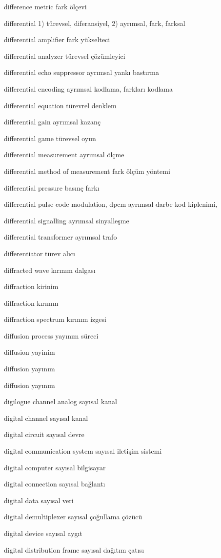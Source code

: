 \documentclass[12pt,fleqn]{article}\usepackage{../../common}
\begin{document}
difference metric fark ölçevi

differential 1) türevsel, diferansiyel, 2) ayrımsal, fark, farksal

differential amplifier fark yükselteci

differential analyzer türevsel çözümleyici

differential echo suppressor ayrımsal yankı bastırma

differential encoding ayrımsal kodlama, farkları kodlama

differential equation türevrel denklem

differential gain ayrımsal kazanç

differential game türevsel oyun

differential measurement ayrımsal ölçme

differential method of measurement fark ölçüm yöntemi

differential pressure basınç farkı

differential pulse code modulation, dpcm ayrımsal darbe kod kiplenimi,

differential signalling ayrımsal sinyalleşme

differential transformer ayrımsal trafo

differentiator türev alıcı

diffracted wave kırınım dalgası

diffraction kirinim

diffraction kırınım

diffraction spectrum kırınım izgesi

diffusion process yayınım süreci

diffusion yayinim

diffusion yayınım

diffusion yayınım

digilogue channel analog sayısal kanal

digital channel sayısal kanal

digital circuit sayısal devre

digital communication system sayısal iletişim sistemi

digital computer sayısal bilgisayar

digital connection sayısal bağlantı

digital data sayısal veri

digital demultiplexer sayısal çoğullama çözücü

digital device sayısal aygıt

digital distribution frame sayısal dağıtım çatısı
\end{document}
